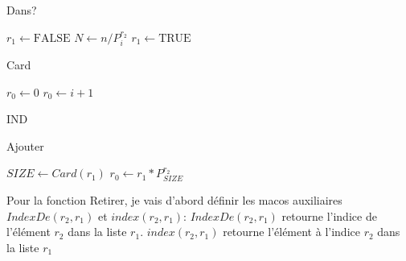 \documentclass{article}
\begin{document}
    \begin{algorithm}[H]
        \caption{Dans?}\label{Dans?}
        \begin{algorithmic}
        \State $r_1 \gets \text{FALSE}$
         
                \State $\textit{N} \gets n / P_{i}^{r_2}$ 
                 
                    \State $\textit{$r_1$} \gets \text{TRUE}$
                \EndIf
            \EndIf
        \EndFor
        \EndProcedure
        \end{algorithmic}
    \end{algorithm}
    
    \begin{algorithm}[H]
        \caption{Card}\label{Card}
        \begin{algorithmic}
        \State $\textit{$r_0$} \gets \text{0}$
                \State $\textit{$r_0$} \gets \textit{$i$} + 1$
            \EndIf
        \EndFor
        \EndProcedure
        \end{algorithmic}
    \end{algorithm}
    
    \begin{algorithm}[H]IND
        \caption{Ajouter}\label{Ajouter}
        \begin{algorithmic}
        \State $\textit{$SIZE$} \gets Card(r_1)$
        \State $\textit{$r_0$} \gets r_1 * P_{SIZE}^{r_2}$
        \EndProcedure
        \end{algorithmic}
    \end{algorithm}

    Pour la fonction Retirer, je vais d'abord définir les macos auxiliaires 
    $IndexDe(r_2, r_1)$ et $index(r_2, r_1)$:
    \newline
    $IndexDe(r_2, r_1)$ retourne l'indice de l'élément $r_2$ dans la liste $r_1$.
    \newline
    $index(r_2, r_1)$ retourne l'élément à l'indice $r_2$ dans la liste $r_1$
\end{document}
